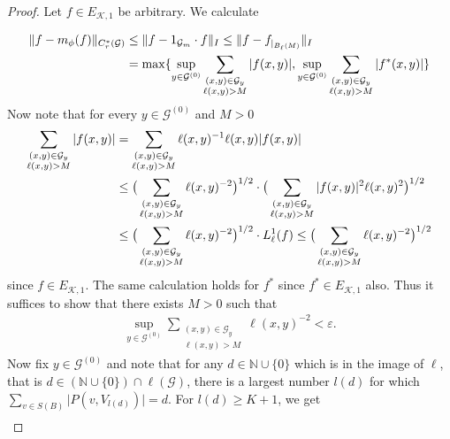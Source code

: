 \documentclass[11pt,a4paper,oneside,final,reqno]{amsart}
\theoremstyle{definition}
\newcommand{\G}{\mathcal{G}}
\newcommand{\Go}{\mathcal{G}^{(0)}}
\newcommand{\cK}{\mathcal{K}}
\newcommand{\Cred}{C_{r}^{*}}
\newcommand{\N}{\mathbb{N}}
\numberwithin{equation}{section}
\begin{document}
\begin{proof}
		

		
		
		Let $f \in E_{\cK, 1}$ be arbitrary. We calculate
		
		\begin{align}\label{eq:AF-multiplier-approximation}
			\Vert f - m_\phi (f) \Vert_{\Cred(\G)} &\leq \Vert f - 1_{\G_m} \cdot f \Vert_I \leq \Vert f - f_{\vert_{B_\ell(M)}} \Vert_I \\
			&= \max \{ \sup_{y \in \Go} \sum_{\substack{(x,y)\in \G_y \\ \ell(x,y) > M}} \vert f(x,y) \vert , \sup_{y \in \Go} \sum_{\substack{(x,y)\in \G_y \\ \ell(x,y) > M}} \vert f^*(x,y) \vert    \} \notag
		\end{align}
		Now note that for every $y \in \Go$ and $M > 0$
		\begin{align}\label{eq:AF-CS-estimate}
			\sum_{\substack{(x,y)\in \G_y \\ \ell(x,y) > M}} \vert f(x,y) \vert &=  \sum_{\substack{(x,y)\in \G_y \\ \ell(x,y) > M}} \ell(x,y)^{-1} \ell(x,y)\vert f(x,y) \vert  \\
			&\leq \big(  \sum_{\substack{(x,y)\in \G_y \\ \ell(x,y) > M}} \ell(x,y)^{-2} \big)^{1/2} \cdot \big( \sum_{\substack{(x,y)\in \G_y \\ \ell(x,y) > M}} \vert f(x,y) \vert^2 \ell(x,y)^2  \big)^{1/2} \notag \\
			&\leq \big(  \sum_{\substack{(x,y)\in \G_y \\ \ell(x,y) > M}} \ell(x,y)^{-2} \big)^{1/2} \cdot L^1_\ell(f) \notag 
			\leq  \big(  \sum_{\substack{(x,y)\in \G_y \\ \ell(x,y) > M}} \ell(x,y)^{-2} \big)^{1/2} \notag
		\end{align}
		since $f \in E_{\cK,1}$. The same calculation holds for $f^*$ since $f^* \in E_{\cK,1}$ also. Thus it suffices to show that there exists $M > 0$ such that
		\begin{align*}
			\sup_{y \in \Go} \sum_{\substack{(x,y)\in \G_y \\ \ell(x,y) > M}} \ell(x,y)^{-2} < \varepsilon.
		\end{align*}
		Now fix $y \in \Go$ and note that for any $d \in \N \cup \{0\}$ which is in the image of $\ell$, that is $d \in (\N \cup \{0\}) \cap \ell(\G)$, there is a largest 
		number $l(d)$ for which $\sum_{v \in S(B)} \vert P(v, V_{l(d)})\vert = d$. For $l(d) \geq K+1$, we get
		\begin{align*}

\end{align*}
\end{proof}
\end{document}
